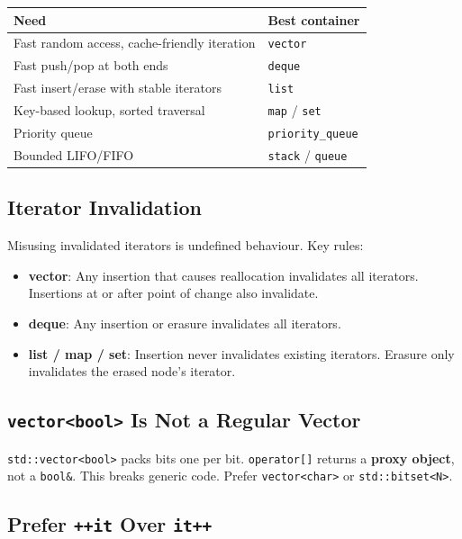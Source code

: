 \begin{center}
\begin{tabular}{|l|l|}
\hline
\textbf{Need} & \textbf{Best container} \\
\hline
Fast random access, cache-friendly iteration & \texttt{vector} \\
Fast push/pop at both ends                   & \texttt{deque} \\
Fast insert/erase with stable iterators      & \texttt{list} \\
Key-based lookup, sorted traversal           & \texttt{map} / \texttt{set} \\
Priority queue                               & \texttt{priority\_queue} \\
Bounded LIFO/FIFO                            & \texttt{stack} / \texttt{queue} \\
\hline
\end{tabular}
\end{center}

\subsection{Iterator Invalidation}

Misusing invalidated iterators is undefined behaviour. Key rules:

\begin{itemize}
    \item \textbf{vector}: Any insertion that causes reallocation invalidates all iterators. Insertions at or after point of change also invalidate.
    \item \textbf{deque}: Any insertion or erasure invalidates all iterators.
    \item \textbf{list / map / set}: Insertion never invalidates existing iterators. Erasure only invalidates the erased node's iterator.
\end{itemize}

\subsection{\texttt{vector<bool>} Is Not a Regular Vector}

\texttt{std::vector<bool>} packs bits one per bit. \texttt{operator[]} returns a \textbf{proxy object}, not a \texttt{bool\&}. This breaks generic code. Prefer \texttt{vector<char>} or \texttt{std::bitset<N>}.

\subsection{Prefer \texttt{++it} Over \texttt{it++}}

